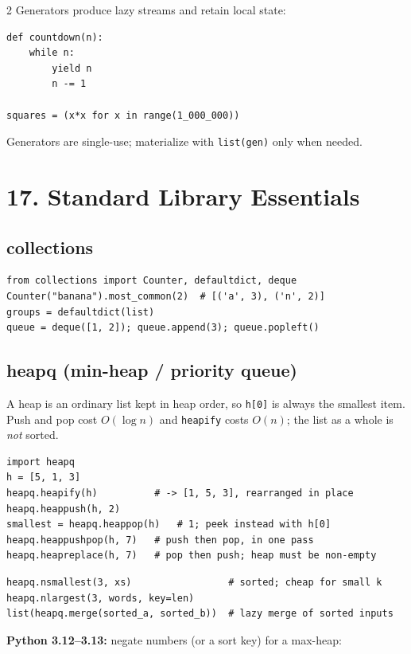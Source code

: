 \documentclass[10pt,a4paper]{article}
\newcommand{\py}[1]{\texttt{#1}}
\begin{document}
\begin{multicols}{2}
Generators produce lazy streams and retain local state:

\begin{lstlisting}
def countdown(n):
    while n:
        yield n
        n -= 1

squares = (x*x for x in range(1_000_000))
\end{lstlisting}

Generators are single-use; materialize with \py{list(gen)} only when needed.

\section{17. Standard Library Essentials}

\subsection{collections}

\begin{lstlisting}
from collections import Counter, defaultdict, deque
Counter("banana").most_common(2)  # [('a', 3), ('n', 2)]
groups = defaultdict(list)
queue = deque([1, 2]); queue.append(3); queue.popleft()
\end{lstlisting}

\subsection{heapq (min-heap / priority queue)}

A heap is an ordinary list kept in heap order, so \py{h[0]} is always the smallest item. Push and pop cost $O(\log n)$ and \py{heapify} costs $O(n)$; the list as a whole is \emph{not} sorted.

\begin{lstlisting}
import heapq
h = [5, 1, 3]
heapq.heapify(h)          # -> [1, 5, 3], rearranged in place
heapq.heappush(h, 2)
smallest = heapq.heappop(h)   # 1; peek instead with h[0]
heapq.heappushpop(h, 7)   # push then pop, in one pass
heapq.heapreplace(h, 7)   # pop then push; heap must be non-empty
\end{lstlisting}

\begin{lstlisting}
heapq.nsmallest(3, xs)                 # sorted; cheap for small k
heapq.nlargest(3, words, key=len)
list(heapq.merge(sorted_a, sorted_b))  # lazy merge of sorted inputs
\end{lstlisting}

\textbf{Python 3.12--3.13:} negate numbers (or a sort key) for a max-heap:


\end{multicols}
\end{document}
